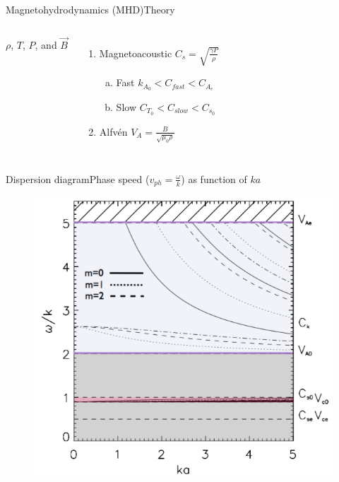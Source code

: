 \documentclass[table]{beamer}
\begin{document}
\begin{frame}{Magnetohydrodynamics (MHD)}{Theory}
\begin{columns}
\begin{itemize}
                $\rho$, $T$, $P$, and $\vec{B}$
        \end{itemize}
        \begin{enumerate}
            \item \textcolor{bblue}{Magnetoacoustic}
                $C_s = \sqrt{\frac{\gamma P}{\rho}}$
                \begin{enumerate}[(a)]
                    \item \textcolor{bblue}{Fast} $k_{A_0} < C_{fast} < C_{A_e} $
                    \item \textcolor{bblue}{Slow} $C_{T_0} < C_{slow} < C_{s_0} $
                \end{enumerate}
            \item \textcolor{bblue}{Alfv\'en}
                $V_A = \frac{B}{\sqrt{\mu_0\rho}}$
        \end{enumerate}
    \end{columns}
\end{frame}%
\begin{frame}{Dispersion diagram}{Phase speed ($v_{ph}=\frac{\omega}{k}$)
    as function of $ka$} 
    \begin{figure}
        \includegraphics[width=0.65\paperwidth]{disp_diagram.png}
    \end{figure}
\end{frame}%
\end{document}
